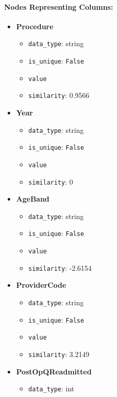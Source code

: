 \paragraph{Nodes Representing Columns:}
\begin{itemize}
    \item \textbf{Procedure}  
        \begin{itemize}
            \item \texttt{data\_type}: string
            \item \texttt{is\_unique}: \texttt{False}
            \item \texttt{value}
            \item \texttt{similarity}: 0.9566
        \end{itemize}
    \item \textbf{Year}  
        \begin{itemize}
            \item \texttt{data\_type}: string
            \item \texttt{is\_unique}: \texttt{False}
            \item \texttt{value}
            \item \texttt{similarity}: 0
        \end{itemize}
    \item \textbf{AgeBand}  
        \begin{itemize}
            \item \texttt{data\_type}: string
            \item \texttt{is\_unique}: \texttt{False}
            \item \texttt{value}
            \item \texttt{similarity}: -2.6154
        \end{itemize}
    \item \textbf{ProviderCode}  
        \begin{itemize}
            \item \texttt{data\_type}: string
            \item \texttt{is\_unique}: \texttt{False}
            \item \texttt{value}
            \item \texttt{similarity}: 3.2149
        \end{itemize}
    \item \textbf{PostOpQReadmitted}  
        \begin{itemize}
            \item \texttt{data\_type}: int

\end{itemize}
\end{itemize}

